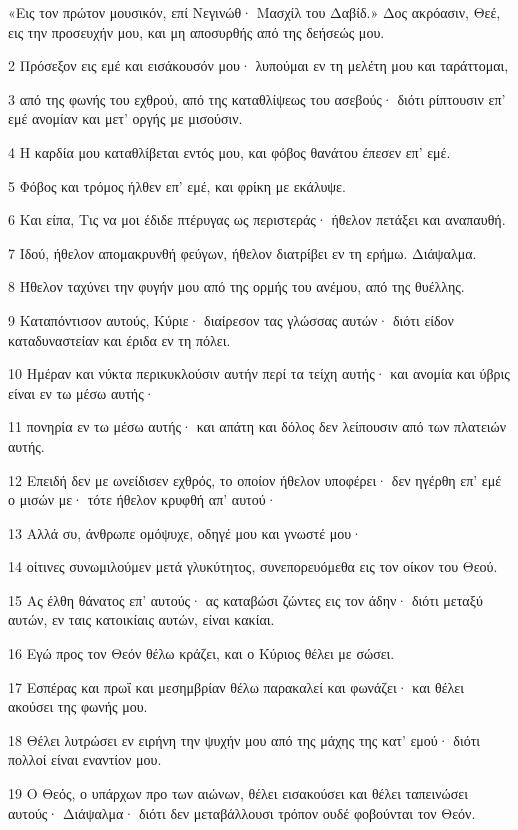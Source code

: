 \par «Εις τον πρώτον μουσικόν, επί Νεγινώθ· Μασχίλ του Δαβίδ.» Δος ακρόασιν, Θεέ, εις την προσευχήν μου, και μη αποσυρθής από της δεήσεώς μου.
\par 2 Πρόσεξον εις εμέ και εισάκουσόν μου· λυπούμαι εν τη μελέτη μου και ταράττομαι,
\par 3 από της φωνής του εχθρού, από της καταθλίψεως του ασεβούς· διότι ρίπτουσιν επ' εμέ ανομίαν και μετ' οργής με μισούσιν.
\par 4 Η καρδία μου καταθλίβεται εντός μου, και φόβος θανάτου έπεσεν επ' εμέ.
\par 5 Φόβος και τρόμος ήλθεν επ' εμέ, και φρίκη με εκάλυψε.
\par 6 Και είπα, Τις να μοι έδιδε πτέρυγας ως περιστεράς· ήθελον πετάξει και αναπαυθή.
\par 7 Ιδού, ήθελον απομακρυνθή φεύγων, ήθελον διατρίβει εν τη ερήμω. Διάψαλμα.
\par 8 Ήθελον ταχύνει την φυγήν μου από της ορμής του ανέμου, από της θυέλλης.
\par 9 Καταπόντισον αυτούς, Κύριε· διαίρεσον τας γλώσσας αυτών· διότι είδον καταδυναστείαν και έριδα εν τη πόλει.
\par 10 Ημέραν και νύκτα περικυκλούσιν αυτήν περί τα τείχη αυτής· και ανομία και ύβρις είναι εν τω μέσω αυτής·
\par 11 πονηρία εν τω μέσω αυτής· και απάτη και δόλος δεν λείπουσιν από των πλατειών αυτής.
\par 12 Επειδή δεν με ωνείδισεν εχθρός, το οποίον ήθελον υποφέρει· δεν ηγέρθη επ' εμέ ο μισών με· τότε ήθελον κρυφθή απ' αυτού·
\par 13 Αλλά συ, άνθρωπε ομόψυχε, οδηγέ μου και γνωστέ μου·
\par 14 οίτινες συνωμιλούμεν μετά γλυκύτητος, συνεπορευόμεθα εις τον οίκον του Θεού.
\par 15 Ας έλθη θάνατος επ' αυτούς· ας καταβώσι ζώντες εις τον άδην· διότι μεταξύ αυτών, εν ταις κατοικίαις αυτών, είναι κακίαι.
\par 16 Εγώ προς τον Θεόν θέλω κράζει, και ο Κύριος θέλει με σώσει.
\par 17 Εσπέρας και πρωΐ και μεσημβρίαν θέλω παρακαλεί και φωνάζει· και θέλει ακούσει της φωνής μου.
\par 18 Θέλει λυτρώσει εν ειρήνη την ψυχήν μου από της μάχης της κατ' εμού· διότι πολλοί είναι εναντίον μου.
\par 19 Ο Θεός, ο υπάρχων προ των αιώνων, θέλει εισακούσει και θέλει ταπεινώσει αυτούς· Διάψαλμα· διότι δεν μεταβάλλουσι τρόπον ουδέ φοβούνται τον Θεόν.
